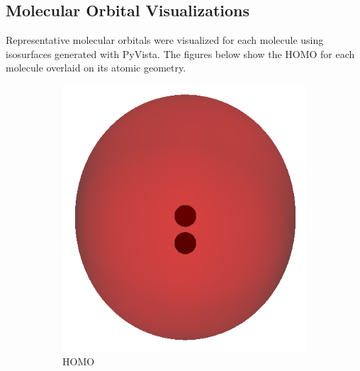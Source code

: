 \documentclass[12pt]{article}
\begin{document}
\subsection*{Molecular Orbital Visualizations}

Representative molecular orbitals were visualized for each molecule using isosurfaces generated with PyVista. The figures below show the HOMO for each molecule overlaid on its atomic geometry.

\begin{figure}[H]
    \centering
    \begin{subfigure}[b]{0.25\textwidth}
        \includegraphics[width=\textwidth]{figures/h2_homo.png}
        \caption{ HOMO}
    \end{subfigure}
    \hspace{1em}
    \begin{subfigure}[b]{0.25\textwidth}

\end{subfigure}
\end{figure}
\end{document}
